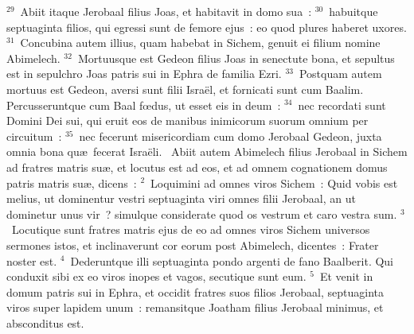 ${}^{29}$~Abiit itaque Jerobaal filius Joas, et habitavit in domo sua~:
${}^{30}$~habuitque septuaginta filios, qui egressi sunt de femore ejus~: eo quod plures haberet uxores.
${}^{31}$~Concubina autem illius, quam habebat in Sichem, genuit ei filium nomine Abimelech.
${}^{32}$~Mortuusque est Gedeon filius Joas in senectute bona, et sepultus est in sepulchro Joas patris sui in Ephra de familia Ezri.
${}^{33}$~Postquam autem mortuus est Gedeon, aversi sunt filii Isra\"el, et fornicati sunt cum Baalim. Percusseruntque cum Baal fœdus, ut esset eis in deum~:
${}^{34}$~nec recordati sunt Domini Dei sui, qui eruit eos de manibus inimicorum suorum omnium per circuitum~:
${}^{35}$~nec fecerunt misericordiam cum domo Jerobaal Gedeon, juxta omnia bona qu\ae\ fecerat Isra\"eli.
~Abiit autem Abimelech filius Jerobaal in Sichem ad fratres matris su\ae , et locutus est ad eos, et ad omnem cognationem domus patris matris su\ae , dicens~:
${}^{2}$~Loquimini ad omnes viros Sichem~: Quid vobis est melius, ut dominentur vestri septuaginta viri omnes filii Jerobaal, an ut dominetur unus vir~? simulque considerate quod os vestrum et caro vestra sum.
${}^{3}$~Locutique sunt fratres matris ejus de eo ad omnes viros Sichem universos sermones istos, et inclinaverunt cor eorum post Abimelech, dicentes~: Frater noster est.
${}^{4}$~Dederuntque illi septuaginta pondo argenti de fano Baalberit. Qui conduxit sibi ex eo viros inopes et vagos, secutique sunt eum.
${}^{5}$~Et venit in domum patris sui in Ephra, et occidit fratres suos filios Jerobaal, septuaginta viros super lapidem unum~: remansitque Joatham filius Jerobaal minimus, et absconditus est.


